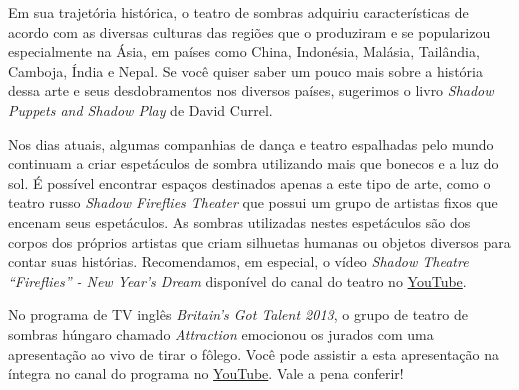 

Em sua trajetória histórica, o teatro de sombras adquiriu características de acordo com as diversas culturas das regiões que o produziram e se popularizou especialmente na Ásia, em países como China, Indonésia, Malásia, Tailândia, Camboja, Índia e Nepal. Se você quiser saber um pouco mais sobre a história dessa arte e seus desdobramentos nos diversos países, sugerimos o livro \emph{Shadow Puppets and Shadow Play} de David Currel.

Nos dias atuais, algumas companhias de dança e teatro espalhadas pelo mundo continuam a criar espetáculos de sombra utilizando mais que bonecos e a luz do sol. É possível encontrar espaços destinados apenas a este tipo de arte, como o teatro russo \emph{Shadow Fireflies Theater} que possui um grupo de artistas fixos que encenam seus espetáculos. As sombras utilizadas nestes espetáculos são dos corpos dos próprios artistas que criam silhuetas humanas ou objetos diversos para contar suas histórias. Recomendamos, em especial, o vídeo \emph{Shadow Theatre “Fireflies” - New Year’s Dream} disponível do canal do teatro no \href{https://www.youtube.com/watch?v=AzS0VwXOlWs}{YouTube}.



No programa de TV inglês \emph{Britain’s Got Talent 2013}, o grupo de teatro de sombras húngaro chamado \emph{Attraction} emocionou os jurados com uma apresentação ao vivo de tirar o fôlego. Você pode assistir a esta apresentação na íntegra no canal do programa no \href{https://www.youtube.com/watch?v=JOZS\_Vq6eKw}{YouTube}. Vale a pena conferir!


